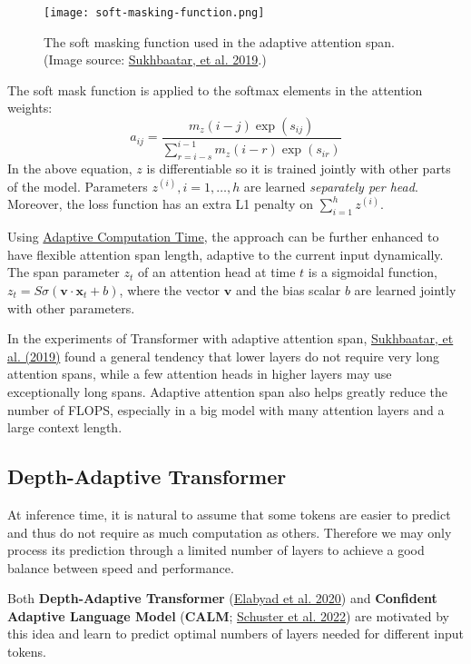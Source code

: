 \documentclass[12pt]{article}
\begin{document}
\begin{figure}[h!]
    \centering
    \texttt{[image: soft-masking-function.png]}
    \caption{The soft masking function used in the adaptive attention span. (Image source: \href{https://arxiv.org/abs/1905.07799}{Sukhbaatar, et al. 2019}.)}
\end{figure}

The soft mask function is applied to the softmax elements in the attention weights:
\[
a_{ij} = \frac{m_z(i-j)\exp(s_{ij})}{\sum_{r=i-s}^{i-1}m_z(i-r) \exp(s_{ir})}
\]
In the above equation, $z$ is differentiable so it is trained jointly with other parts of the model. Parameters $z^{(i)}, i=1, \dots, h$ are learned \emph{separately per head}. Moreover, the loss function has an extra L1 penalty on $\sum_{i=1}^h z^{(i)}$.

Using \href{https://lilianweng.github.io/posts/2020-04-07-the-transformer-family/#adaptive-computation-time-act}{Adaptive Computation Time}, the approach can be further enhanced to have flexible attention span length, adaptive to the current input dynamically. The span parameter $z_t$ of an attention head at time $t$ is a sigmoidal function, $z_t = S \sigma(\mathbf{v} \cdot \mathbf{x}_t +b)$, where the vector $\mathbf{v}$ and the bias scalar $b$ are learned jointly with other parameters.

In the experiments of Transformer with adaptive attention span, \href{https://arxiv.org/abs/1905.07799}{Sukhbaatar, et al. (2019)} found a general tendency that lower layers do not require very long attention spans, while a few attention heads in higher layers may use exceptionally long spans. Adaptive attention span also helps greatly reduce the number of FLOPS, especially in a big model with many attention layers and a large context length.

\subsection{Depth-Adaptive Transformer}
At inference time, it is natural to assume that some tokens are easier to predict and thus do not require as much computation as others. Therefore we may only process its prediction through a limited number of layers to achieve a good balance between speed and performance.

Both \textbf{Depth-Adaptive Transformer} (\href{https://arxiv.org/abs/1910.10073}{Elabyad et al. 2020}) and \textbf{Confident Adaptive Language Model} (\textbf{CALM}; \href{https://arxiv.org/abs/2207.07061}{Schuster et al. 2022}) are motivated by this idea and learn to predict optimal numbers of layers needed for different input tokens.
\end{document}
